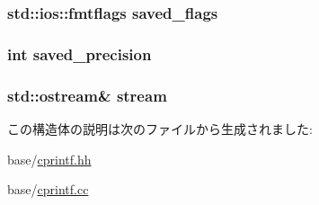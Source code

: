 \label{structcp_1_1Print_a5fbcf9cf4d309f66f61f423eb2edc2f3}
\hypertarget{structcp_1_1Print_ab596cd0773ceeffee59a2988768c7fb0}{
\subsubsection[{saved\_\-flags}]{\setlength{\rightskip}{0pt plus 5cm}std::ios::fmtflags {\bf saved\_\-flags}}}
\label{structcp_1_1Print_ab596cd0773ceeffee59a2988768c7fb0}
\hypertarget{structcp_1_1Print_ace88513f3f4c11ac821a4ec110ecdfc4}{
\subsubsection[{saved\_\-precision}]{\setlength{\rightskip}{0pt plus 5cm}int {\bf saved\_\-precision}}}
\label{structcp_1_1Print_ace88513f3f4c11ac821a4ec110ecdfc4}
\hypertarget{structcp_1_1Print_aeacb68b8c7e9ae9b97ab9c6ab41940cb}{
\subsubsection[{stream}]{\setlength{\rightskip}{0pt plus 5cm}std::ostream\& {\bf stream}}}
\label{structcp_1_1Print_aeacb68b8c7e9ae9b97ab9c6ab41940cb}


この構造体の説明は次のファイルから生成されました:\begin{DoxyCompactItemize}
\item 
base/\hyperlink{cprintf_8hh}{cprintf.hh}\item 
base/\hyperlink{cprintf_8cc}{cprintf.cc}\end{DoxyCompactItemize}

